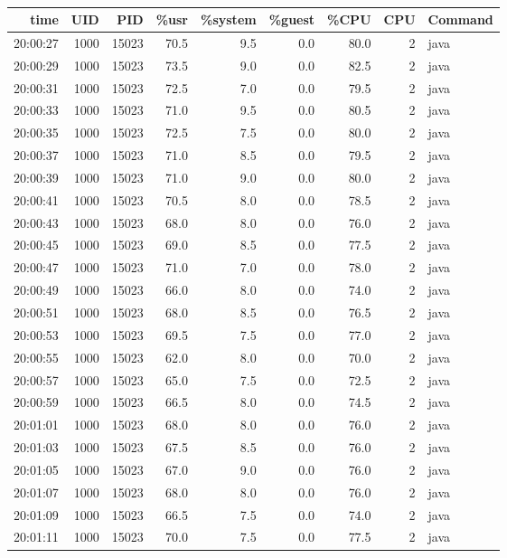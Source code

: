 \documentclass[11pt]{article}
\begin{document}
\begin{table}[htbp]
\caption{}
\centering
\begin{tabular}{rrrrrrrrl}
time & UID & PID & \%usr & \%system & \%guest & \%CPU & CPU & Command\\
\hline
20:00:27 & 1000 & 15023 & 70.5 & 9.5 & 0.0 & 80.0 & 2 & java\\
20:00:29 & 1000 & 15023 & 73.5 & 9.0 & 0.0 & 82.5 & 2 & java\\
20:00:31 & 1000 & 15023 & 72.5 & 7.0 & 0.0 & 79.5 & 2 & java\\
20:00:33 & 1000 & 15023 & 71.0 & 9.5 & 0.0 & 80.5 & 2 & java\\
20:00:35 & 1000 & 15023 & 72.5 & 7.5 & 0.0 & 80.0 & 2 & java\\
20:00:37 & 1000 & 15023 & 71.0 & 8.5 & 0.0 & 79.5 & 2 & java\\
20:00:39 & 1000 & 15023 & 71.0 & 9.0 & 0.0 & 80.0 & 2 & java\\
20:00:41 & 1000 & 15023 & 70.5 & 8.0 & 0.0 & 78.5 & 2 & java\\
20:00:43 & 1000 & 15023 & 68.0 & 8.0 & 0.0 & 76.0 & 2 & java\\
20:00:45 & 1000 & 15023 & 69.0 & 8.5 & 0.0 & 77.5 & 2 & java\\
20:00:47 & 1000 & 15023 & 71.0 & 7.0 & 0.0 & 78.0 & 2 & java\\
20:00:49 & 1000 & 15023 & 66.0 & 8.0 & 0.0 & 74.0 & 2 & java\\
20:00:51 & 1000 & 15023 & 68.0 & 8.5 & 0.0 & 76.5 & 2 & java\\
20:00:53 & 1000 & 15023 & 69.5 & 7.5 & 0.0 & 77.0 & 2 & java\\
20:00:55 & 1000 & 15023 & 62.0 & 8.0 & 0.0 & 70.0 & 2 & java\\
20:00:57 & 1000 & 15023 & 65.0 & 7.5 & 0.0 & 72.5 & 2 & java\\
20:00:59 & 1000 & 15023 & 66.5 & 8.0 & 0.0 & 74.5 & 2 & java\\
20:01:01 & 1000 & 15023 & 68.0 & 8.0 & 0.0 & 76.0 & 2 & java\\
20:01:03 & 1000 & 15023 & 67.5 & 8.5 & 0.0 & 76.0 & 2 & java\\
20:01:05 & 1000 & 15023 & 67.0 & 9.0 & 0.0 & 76.0 & 2 & java\\
20:01:07 & 1000 & 15023 & 68.0 & 8.0 & 0.0 & 76.0 & 2 & java\\
20:01:09 & 1000 & 15023 & 66.5 & 7.5 & 0.0 & 74.0 & 2 & java\\
20:01:11 & 1000 & 15023 & 70.0 & 7.5 & 0.0 & 77.5 & 2 & java\\

\end{tabular}
\end{table}
\end{document}
